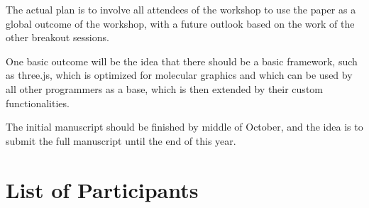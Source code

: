 \documentclass[a4paper]{article}
\begin{document}
The actual plan is to involve all attendees of the workshop to use the paper as a global outcome of the workshop, with a future outlook based on the work of the other breakout sessions.

One basic outcome will be the idea that there should be a basic framework, such as three.js, which is optimized for molecular graphics and which can be used by all other programmers as a base, which is then extended by their custom functionalities.

The initial manuscript should be finished by middle of October, and the idea is to submit the full manuscript until the end of this year.

\clearpage

\section{List of Participants}
\end{document}
